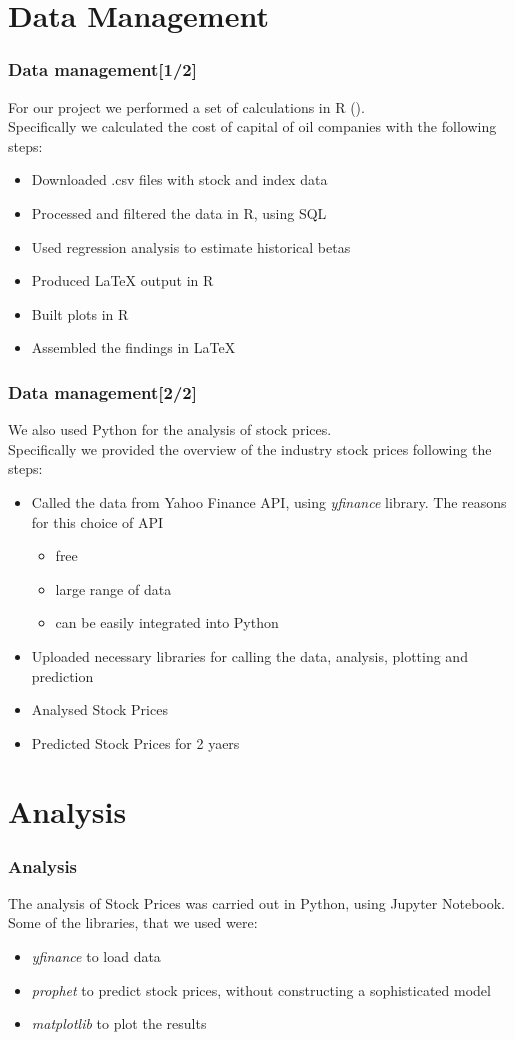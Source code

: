 \documentclass {beamer}
\begin{document}
\section{Data Management}
\begin{frame}
\frametitle{Data management[1/2]}
For our project we performed a set of calculations in R ().\\
Specifically we calculated the cost of capital of oil companies with the following steps:
\begin{itemize}
\item Downloaded .csv files with stock and index data
\item Processed and filtered the data in R, using SQL
\item Used regression analysis to estimate historical betas
\item Produced LaTeX output in R
\item Built plots in R
\item Assembled the findings in LaTeX
\end{itemize}
\end{frame}

\begin{frame}
\frametitle{Data management[2/2]}
We also used Python for the analysis of stock prices.\\
Specifically we provided the overview of the industry stock prices  following the  steps:
\begin{itemize}
\item Called the data from Yahoo Finance API, using \emph{yfinance} library. The reasons for this choice of API
	\begin{itemize}
	\item free
	\item  large range of data
	\item  can be easily integrated into Python
	\end{itemize}
\item Uploaded necessary libraries for calling the data, analysis, plotting and prediction
\item Analysed Stock Prices
\item Predicted Stock Prices for 2 yaers
\end{itemize}

\end{frame}

\section{Analysis}
\begin{frame}
\frametitle{Analysis}
The analysis of Stock Prices was carried out in Python, using Jupyter Notebook.\\
Some of the libraries, that we used were:
\begin{itemize}
\item \emph{yfinance} to load data
\item \emph{prophet}  to predict stock prices, without constructing a sophisticated model
\item \emph{matplotlib} to plot the results
\end{itemize}
\end{frame}
\end{document}
